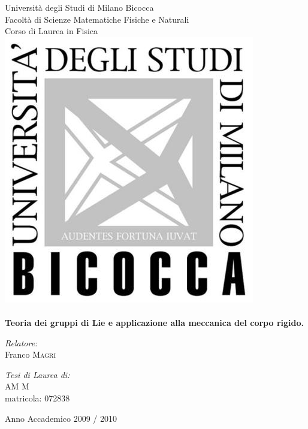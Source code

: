 \begin{titlepage}




\begin{center}
{\Huge Università degli Studi di Milano Bicocca}
\\[.1cm]
{\huge Facoltà di Scienze  Matematiche Fisiche e Naturali}
\\[.5cm]
{\huge Corso di Laurea in Fisica}
\\[1.5cm]
\includegraphics[keepaspectratio]{./immagini/logo}
\\[1.5cm]
\HRule \\[0.4cm]
{\huge \textbf{Teoria dei gruppi di Lie e applicazione alla meccanica del corpo rigido.}}
\HRule \\[1.5cm]


\begin{minipage}{0.4\textwidth}
\begin{flushleft} \large
{\Large \emph{Relatore:}}\\
{\Large Franco \textsc{Magri}}
\end{flushleft}
\end{minipage}
\begin{minipage}{0.4\textwidth}
\begin{flushright} \large
{\Large \emph{Tesi di Laurea di:}} \\
{\Large AM \textsc{M}} \\
{\large matricola: 072838}
\end{flushright}
\end{minipage}

\vfill

{\Large Anno Accademico 2009 / 2010}
\end{center}

\end{titlepage}